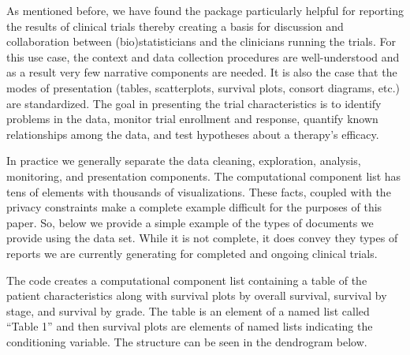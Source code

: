 \documentclass[
]{jss}
\begin{document}
\label{sect:simple-example}

As mentioned before, we have found the  package
particularly helpful for reporting the results of clinical trials
thereby creating a basis for discussion and collaboration between
(bio)statisticians and the clinicians running the trials. For this use
case, the context and data collection procedures are well-understood and
as a result very few narrative components are needed. It is also the
case that the modes of presentation (tables, scatterplots, survival
plots, consort diagrams, etc.) are standardized. The goal in presenting
the trial characteristics is to identify problems in the data, monitor
trial enrollment and response, quantify known relationships among the
data, and test hypotheses about a therapy's efficacy.

In practice we generally separate the data cleaning, exploration,
analysis, monitoring, and presentation components. The computational
component list has tens of elements with thousands of visualizations.
These facts, coupled with the privacy constraints make a complete
example difficult for the purposes of this paper. So, below we provide a
simple example of the types of documents we provide using the
 data set. While it is not complete, it does
convey they types of reports we are currently generating for completed
and ongoing clinical trials.

The code creates a computational component list containing a table of
the patient characteristics along with survival plots by overall
survival, survival by stage, and survival by grade. The table is an
element of a named list called ``Table 1'' and then survival plots are
elements of named lists indicating the conditioning variable. The
structure can be seen in the dendrogram below.
\end{document}
